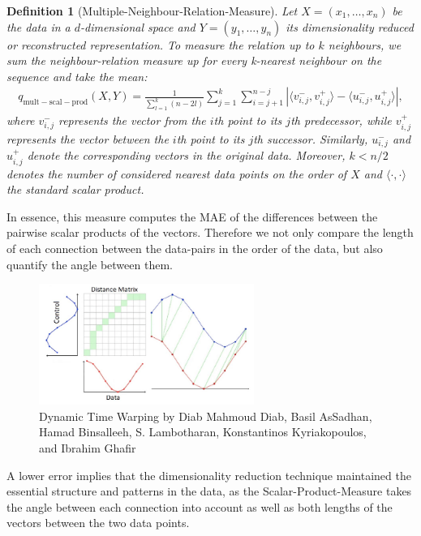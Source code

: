 \documentclass[pdftex,12pt,a4paper]{report}
\newtheorem{definition}{Definition}[section]
\begin{document}
\begin{definition}[Multiple-Neighbour-Relation-Measure] \label{Multiple-Neighbour-Relation-Measure}
    Let $X = (x_1, \dots, x_n)$ be the data in a $d$-dimensional space and $Y = (y_1, \dots, y_n)$ its dimensionality reduced or reconstructed representation.
    To measure the relation up to $k$ neighbours, we sum the neighbour-relation measure up for every k-nearest neighbour on the sequence and take the mean:
    \begin{align*}
         q_{\mathrm{mult-scal-prod}} (X,Y) =
        \frac{1}{\sum_{l = 1}^k (n - 2l)} \sum_{j=1}^{k} \sum_{i = j + 1} ^{n-j} |\langle v_{i,j}^-,v_{i,j}^+ \rangle - \langle u_{i,j}^-,u_{i,j}^+ \rangle|,
    \end{align*}
    where $v_{i,j}^-$ represents the vector from the $i$th point to its $j$th predecessor, while $v_{i,j}^+$ represents the vector between the $i$th point to its $j$th successor.
    Similarly, $u_{i,j}^-$ and $u_{i,j}^+$ denote the corresponding vectors in the original data.
    Moreover, $k < n / 2$ denotes the number of considered nearest data points on the order of $X$ and $\langle \cdot, \cdot \rangle$ the standard scalar product.
\end{definition}

In essence, this measure computes the MAE of the differences between the pairwise scalar products of the vectors.
Therefore we not only compare the length of each connection between the data-pairs in the order of the data, but also quantify the angle between them.
\begin{figure}
    \includegraphics[width=7cm]{images/Dynamic-Time-Warping-23.png}
    \caption{Dynamic Time Warping by Diab Mahmoud Diab, Basil AsSadhan, Hamad Binsalleeh, S. Lambotharan, Konstantinos Kyriakopoulos, and Ibrahim Ghafir \cite{dtw-image}}\label{wrap-fig:1}
\end{figure} 
A lower error implies that the dimensionality reduction technique maintained the essential structure and patterns in the data, as the Scalar-Product-Measure takes the angle between each connection into account as well as both lengths of the vectors between the two data points.
\end{document}
